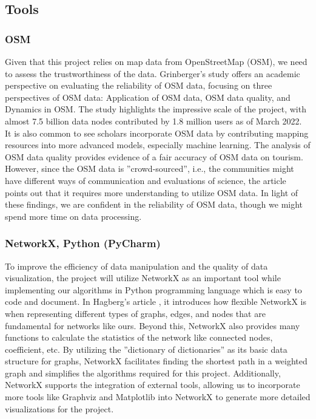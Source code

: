 \documentclass[12pt]{article}
\begin{document}
\subsection{Tools}

\subsubsection{OSM}

Given that this project relies on map data from OpenStreetMap (OSM), we need to assess the trustworthiness of the data. Grinberger’s study \cite{Grinberger_Minghini_Juhász_Yeboah_Mooney_2022} offers an academic perspective on evaluating the reliability of OSM data, focusing on three perspectives of OSM data: Application of OSM data, OSM data quality, and Dynamics in OSM. The study highlights the impressive scale of the project, with almost 7.5 billion data nodes contributed by 1.8 million users as of March 2022. It is also common to see scholars incorporate OSM data by contributing mapping resources into more advanced models, especially machine learning. The analysis of OSM data quality provides evidence of a fair accuracy of OSM data on tourism. However, since the OSM data is ”crowd-sourced”, i.e., the communities might have different ways of communication and evaluations of science, the article points out that it requires more understanding to utilize OSM data. In light of these findings, we are confident in the reliability of OSM data, though we might spend more time on data processing.

\subsubsection{NetworkX, Python (PyCharm)}

To improve the efficiency of data manipulation and the quality of data visualization, the project will utilize NetworkX as an important tool while implementing our algorithms in Python programming language which is easy to code and document. In Hagberg’s article \cite{Hagberg_Aric_Pieter_Daniel_2008}, it introduces how flexible NetworkX is when representing different types of graphs, edges, and nodes that are fundamental for networks like ours. Beyond this, NetworkX also provides many functions to calculate the statistics of the network like connected nodes, coefficient, etc. By utilizing the ”dictionary of dictionaries” as its basic data structure for graphs, NetworkX facilitates finding the shortest path in a weighted graph and simplifies the algorithms required for this project. Additionally, NetworkX supports the integration of external tools, allowing us to incorporate more tools like Graphviz and Matplotlib into NetworkX to generate more detailed visualizations for the project.
\end{document}
